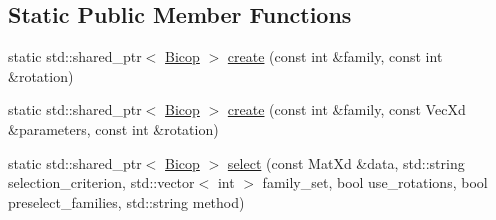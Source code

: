 \subsection*{Static Public Member Functions}
\begin{DoxyCompactItemize}
\item 
static std\+::shared\+\_\+ptr$<$ \hyperlink{class_bicop}{Bicop} $>$ \hyperlink{class_bicop_acb60163725518f4ccfd7694272014686}{create} (const int \&family, const int \&rotation)
\item 
static std\+::shared\+\_\+ptr$<$ \hyperlink{class_bicop}{Bicop} $>$ \hyperlink{class_bicop_a4bfa38e69a96cc8a7c689e1161942e46}{create} (const int \&family, const Vec\+Xd \&parameters, const int \&rotation)
\item 
static std\+::shared\+\_\+ptr$<$ \hyperlink{class_bicop}{Bicop} $>$ \hyperlink{class_bicop_a6b1c154595bb17cd73f81cb4f563a776}{select} (const Mat\+Xd \&data, std\+::string selection\+\_\+criterion, std\+::vector$<$ int $>$ family\+\_\+set, bool use\+\_\+rotations, bool preselect\+\_\+families, std\+::string method)
\end{DoxyCompactItemize}

